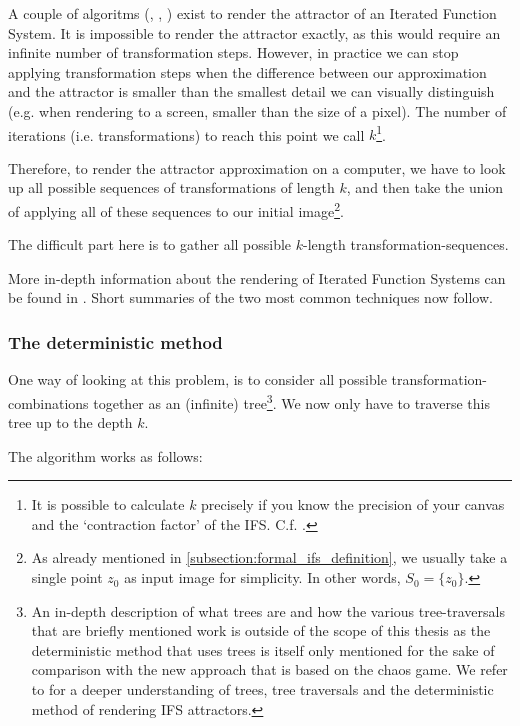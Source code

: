 \documentclass[11pt]{article}
\begin{document}
A couple of algoritms (\cite{barnsley1988fractals}, \cite{hepting1991rendering}, \cite{lawlor2012gpu}) exist to render the attractor of an Iterated Function System. 
It is impossible to render the attractor exactly, as this would require an infinite number of transformation steps.
However, in practice we can stop applying transformation steps when the difference between our approximation and the attractor is smaller than
the smallest detail we can visually distinguish (e.g. when rendering to a screen, smaller than the size of a pixel).
The number of iterations (i.e. transformations) to reach this point we call \(k\)\footnote{It is possible to calculate \(k\) precisely if you know the precision of your canvas and the `contraction factor' of the IFS. C.f. \cite{barnsley1988fractals}.}.

Therefore, to render the attractor approximation on a computer, 
we have to look up all possible sequences of transformations of length \(k\),
and then take the union of applying all of these sequences to our initial image\footnote{As already mentioned in \autoref{subsection:formal_ifs_definition}, we usually take a single point \(z_0\) as input image for simplicity. In other words, \(S_0 = \{z_0\}\).}.

The difficult part here is to gather all possible \(k\)-length transformation-sequences.

More in-depth information about the rendering of Iterated Function Systems can be found in \cite{hepting1991rendering}. 
Short summaries of the two most common techniques now follow.

\subsubsection{The deterministic method}
\label{sec:orga91d556}

One way of looking at this problem, is to consider all possible transformation-combinations together as an (infinite) tree\footnote{An in-depth description of what trees are and how the various tree-traversals that are briefly mentioned work is outside of the scope of this thesis as the deterministic method that uses trees is itself only mentioned for the sake of comparison with the new approach that is based on the chaos game.
We refer to \cite{hepting1991rendering} for a deeper understanding of trees, tree traversals and the deterministic method of rendering IFS attractors.}.
We now only have to traverse this tree up to the depth \(k\).

The algorithm works as follows:
\end{document}
